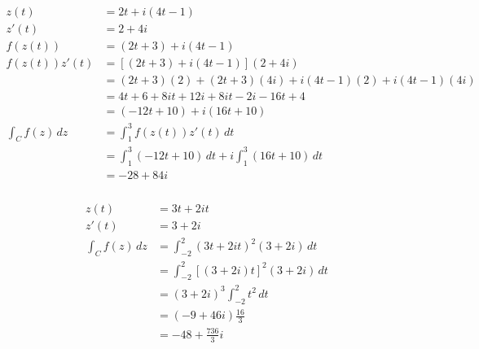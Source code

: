 \documentclass{article}
\begin{document}
\subsubsection{}

\begin{align*}
  z(t)              & = 2 t + i (4 t - 1)                                                     \\
  z'(t)             & = 2 + 4 i                                                               \\
  f(z(t))           & = (2 t + 3) + i (4 t - 1)                                               \\
  f(z(t)) z'(t)     & = [(2 t + 3) + i (4 t - 1)] (2 + 4 i)                                   \\
                    & = (2 t + 3) (2) + (2 t + 3) (4 i) + i (4 t - 1) (2) + i (4 t - 1) (4 i) \\
                    & = 4 t + 6 + 8 i t + 12 i + 8 i t - 2 i - 16 t + 4                       \\
                    & = (-12 t + 10) + i (16 t + 10)                                          \\
  \int_C f(z) \,d z & = \int_1^3 f(z(t)) z'(t) \,d t                                          \\
                    & = \int_1^3 (-12 t + 10) \,d t + i \int_1^3 (16 t + 10) \,d t            \\
                    & = -28 + 84 i
\end{align*}

\setcounter{subsubsection}{2}
\subsubsection{}

\begin{align*}
  z(t)              & = 3 t + 2 i t                                 \\
  z'(t)             & = 3 + 2 i                                     \\
  \int_C f(z) \,d z & = \int_{-2}^2 (3 t + 2 i t)^2 (3 + 2 i) \,d t \\
                    & = \int_{-2}^2 [(3 + 2 i) t]^2 (3 + 2 i) \,d t \\
                    & = (3 + 2 i)^3 \int_{-2}^2 t^2 \,d t           \\
                    & = (-9 + 46 i) \frac{16}{3}                    \\
                    & = -48 + \frac{736}{3} i
\end{align*}
\end{document}
